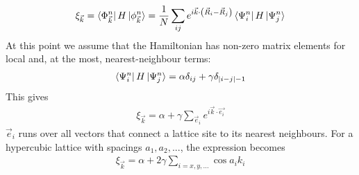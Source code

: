 \documentclass[12pt,onecolumn]{revtex4-2}
\begin{document}
\begin{equation}\begin{aligned}
	\xi_{\vec k} = \bra{\Phi^n_{\vec k}}H\ket{\phi^n_{\vec k}} = \frac{1}{N}\sum_{ij}e^{i \vec k \cdot\left(\vec R_i - \vec R_j\right)}\bra{\Psi^n_i}H\ket{\Psi^n_j}
\end{aligned}\end{equation}
At this point we assume that the Hamiltonian has non-zero matrix elements for local and, at the most, nearest-neighbour terms:
\begin{equation}\begin{aligned}
	\bra{\Psi^n_i}H\ket{\Psi^n_j} = \alpha \delta_{ij} + \gamma \delta_{|i-j| - 1}
\end{aligned}\end{equation}
This gives
\begin{equation}\begin{aligned}
	\xi_{\vec k} = \alpha + \gamma\sum_{\vec e_i}e^{i \vec{ k}\cdot\vec{ e_i}}
\end{aligned}\end{equation}
\(\vec e_i\) runs over all vectors that connect a lattice site to its nearest neighbours. For a hypercubic lattice with spacings \(a_1, a_2, ...\), the expression becomes
\begin{equation}\begin{aligned}
	\xi_{\vec k} = \alpha + 2\gamma\sum_{i=x,y,...}\cos a_i k_i
\end{aligned}\end{equation}
\end{document}
